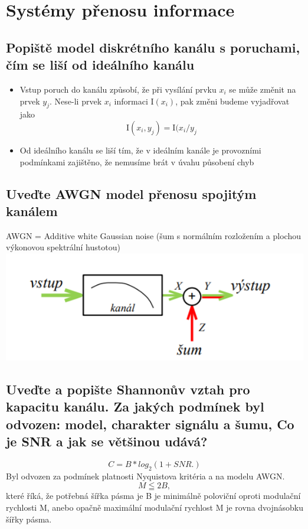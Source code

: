\clearpage
\section{Systémy přenosu informace}
\subsection{Popiště model diskrétního kanálu s poruchami, čím se liší od ideálního kanálu}
\begin{itemize}
    \item Vstup poruch do kanálu způsobí, že při vysílání prvku $x_i$ se může změnit na prvek $y_j$.
    Nese-li prvek $x_i$ informaci I$(x_i)$, pak změni budeme vyjadřovat jako
    $$\mathrm{I}(x_i, y_j) = \mathrm{I}(x_i / y_j$$
    \item Od ideálního kanálu se liší tím, že v ideálním kanále je provozními podmínkami zajištěno, že nemusíme brát v úvahu působení chyb
\end{itemize}

\subsection{Uveďte AWGN model přenosu spojitým kanálem}
AWGN = Additive white Gaussian noise (šum s normálním rozložením a plochou výkonovou spektrální hustotou)\\
\includegraphics[]{images/AWGN.png}

\subsection{Uveďte a popište Shannonův vztah pro kapacitu kanálu. Za jakých podmínek byl odvozen: model, charakter signálu a šumu, Co je SNR a jak se většinou udává?}
$$C = B*log_2(1+SNR.)$$
Byl odvozen za podmínek platnosti Nyquistova kritéria a na modelu AWGN.
$$M \leqq 2B,$$ které říká, že potřebná šířka pásma je B je minimálně poloviční oproti modulační rychlosti M, anebo opačně maximální modulační rychlost M je rovna dvojnásobku šířky pásma.

